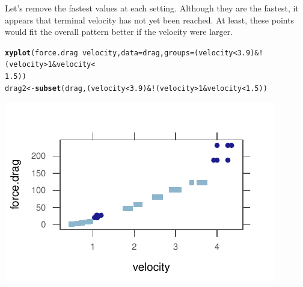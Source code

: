 \documentclass[twoside]{book}\usepackage[]{graphicx}\usepackage[]{xcolor}
\makeatletter
\def\maxwidth{ %
  \ifdim\Gin@nat@width>\linewidth
    \linewidth
  \else
    \Gin@nat@width
  \fi
}
\newcommand{\hlnum}[1]{\textcolor[rgb]{0.686,0.059,0.569}{#1}}%
\newcommand{\hlopt}[1]{\textcolor[rgb]{0,0,0}{#1}}%
\newcommand{\hlstd}[1]{\textcolor[rgb]{0.345,0.345,0.345}{#1}}%
\newcommand{\hlkwb}[1]{\textcolor[rgb]{0.69,0.353,0.396}{#1}}%
\newcommand{\hlkwc}[1]{\textcolor[rgb]{0.333,0.667,0.333}{#1}}%
\newcommand{\hlkwd}[1]{\textcolor[rgb]{0.737,0.353,0.396}{\textbf{#1}}}%
\newenvironment{kframe}{%
 \def\at@end@of@kframe{}%
 \ifinner\ifhmode%
  \def\at@end@of@kframe{\end{minipage}}%
  \begin{minipage}{\columnwidth}%
 \fi\fi%
 \def\FrameCommand##1{\hskip\@totalleftmargin \hskip-\fboxsep
 \colorbox{shadecolor}{##1}\hskip-\fboxsep
     \hskip-\linewidth \hskip-\@totalleftmargin \hskip\columnwidth}%
 \MakeFramed {\advance\hsize-\width
   \@totalleftmargin\z@ \linewidth\hsize
   \@setminipage}}%
 {\par\unskip\endMakeFramed%
 \at@end@of@kframe}
\newenvironment{knitrout}{}{} %
\makeatother
\begin{document}
\begin{solution}
Let's remove the fastest values at each setting.  Although they are the fastest, it appears 
that terminal velocity has not yet been reached.  At least, these points would fit the 
overall pattern better if the velocity were larger.
\begin{knitrout}
\color{fgcolor}\begin{kframe}
\begin{alltt}
\hlkwd{xyplot}\hlstd{(force.drag} \hlopt{~} \hlstd{velocity,} \hlkwc{data} \hlstd{= drag,} \hlkwc{groups} \hlstd{= (velocity} \hlopt{<} \hlnum{3.9}\hlstd{)} \hlopt{& !}\hlstd{(velocity} \hlopt{>} \hlnum{1} \hlopt{&} \hlstd{velocity} \hlopt{<}
    \hlnum{1.5}\hlstd{))}
\hlstd{drag2} \hlkwb{<-} \hlkwd{subset}\hlstd{(drag, (velocity} \hlopt{<} \hlnum{3.9}\hlstd{)} \hlopt{& !}\hlstd{(velocity} \hlopt{>} \hlnum{1} \hlopt{&} \hlstd{velocity} \hlopt{<} \hlnum{1.5}\hlstd{))}
\end{alltt}
\end{kframe}

{\centering \includegraphics[width=\maxwidth]{figures/fig-unnamed-chunk-284-1} 

}




\end{knitrout}
\end{solution}
\end{document}
